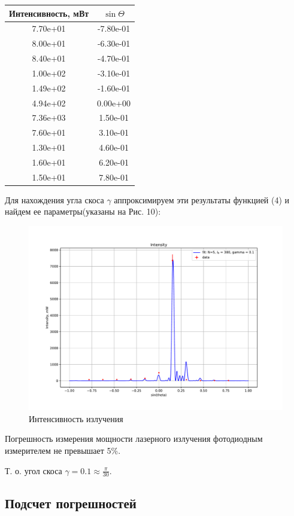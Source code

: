 \documentclass[a4paper, 12pt]{article}
\begin{document}
\begin{center}
\begin{tabular}{| c| c |}
\hline
Интенсивность, мВт  &  $\sin\Theta$\\ 
\hline
7.70e+01 & -7.80e-01\\
 8.00e+01 & -6.30e-01\\
 8.40e+01 & -4.70e-01\\
 1.00e+02 & -3.10e-01\\
 1.49e+02 & -1.60e-01\\
 4.94e+02 & 0.00e+00\\
 7.36e+03 & 1.50e-01\\
 7.60e+01 & 3.10e-01\\
 1.30e+01 & 4.60e-01\\
 1.60e+01 & 6.20e-01\\
1.50e+01 & 7.80e-01\\
\hline
\end{tabular}
\end{center}

Для нахождения угла скоса $\gamma$ аппроксимируем эти результаты функцией (4) и найдем ее параметры(указаны на Рис. 10):

\begin{figure}[H]
	\centering
	\includegraphics[scale=0.65]{Intensity.pdf}
	\caption{Интенсивность излучения}
\end{figure}
Погрешность измерения мощности лазерного излучения фотодиодным измерителем не превышает 5\%.

Т. о. угол скоса $\gamma = 0.1 \approx \frac {\pi}{30}$.

\subsection{Подсчет погрешностей}
\end{document}
